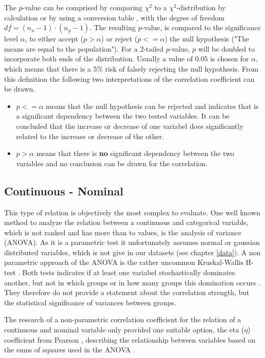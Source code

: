 \documentclass[a4paper,headsepline,footsepline,fontsize=11pt,BCOR=12mm,DIV=12]{report}
\begin{document}
The $p$-value can be comprised by comparing $\chi^2$ to a $\chi^2$-distribution by calculation or by using a conversion table \cite{Piegorsch2002}, with the degree of freedom $df = (n_x - 1) \cdot (n_y - 1)$. The resulting  $p$-value, is compared to the significance level $\alpha$, to either accept ($p > \alpha$) or reject ($p <= \alpha$) the null hypothesis ("The means are equal to the population"). For a 2-tailed $p$-value, $p$ will be doubled to incorporate both ends of the distribution. Usually a value of $0.05$ is chosen for $\alpha$, which means that there is a 5\% risk of falsely rejecting the null hypothesis. From this definition the following two interpretations of the correlation coefficient can be drawn. \cite{OTSD2020}

\begin{itemize}
	\item $p <= \alpha$ means that the null hypothesis can be rejected and indicates that is a significant dependency between the two tested variables. It can be concluded that the increase or decrease of one variabel does significantly related to the increase or decrease of the other.
	\item $p > \alpha$ means that there is \textbf{no} significant dependency between the two variables and no conclusion can be drawn for the correlation.
\end{itemize}

\subsection{Continuous - Nominal}
This type of relation is objectively the most complex to evaluate. One well known method to analyze the relation between a continuous and categorical variable, which is not ranked and has more than to values, is the analysis of variance (ANOVA). As it is a parametric test it unfortunately assumes normal or gaussian distributed variables, which is not give in our datasets (see chapter \ref{data}). A non parametric approach of the ANOVA is the rather uncommon Kruskal-Wallis H-test \cite{Leon1998}. Both tests indicates if at least one variabel stochastically dominates another, but not in which groups or in how many groups this domination occurs \cite{OTSD2020}. They therefore do not provide a statement about the correlation strength, but the statistical significance of variances between groups.

The research of a non-parametric correlation coefficient for the relation of a continuous and nominal variable only provided one suitable option, the eta ($\eta$) coefficient from Pearson \cite{Benninghaus2007}, describing the relationship between variables based on the sums of squares used in the ANOVA \cite{Lewis2012,Benninghaus2007}.
\end{document}
